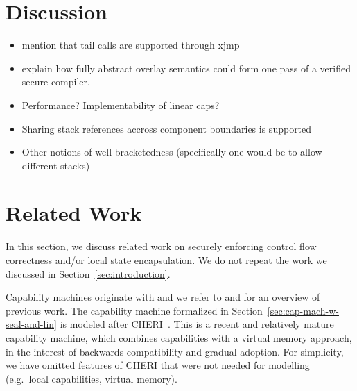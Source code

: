 \documentclass[acmsmall,review,anonymous]{acmart}\settopmatter{printfolios=true,printccs=false,printacmref=false}
\begin{document}
\section{Discussion}
\label{sec:discussion}
\begin{itemize}
\item mention that tail calls are supported through xjmp
\item explain how fully abstract overlay semantics could form one pass of a verified secure compiler.
\item Performance?  Implementability of linear caps?
\item Sharing stack references accross component boundaries is supported
\item Other notions of well-bracketedness (specifically one would be to allow different stacks)
\end{itemize}

\section{Related Work}

In this section, we discuss related work on securely enforcing control flow correctness and/or local state encapsulation.
We do not repeat the work we discussed in Section~\ref{sec:introduction}.

Capability machines originate with \citet{dennis_programming_1966} and we refer to \citet{levy_capability-based_1984} and \citet{watson_cheri:_2015} for an overview of previous work.
The capability machine formalized in Section~\ref{sec:cap-mach-w-seal-and-lin} is modeled after CHERI~\citep{watson_cheri:_2015,woodruff_cheri_2014}.
This is a recent and relatively mature capability machine, which combines capabilities with a virtual memory approach, in the interest of backwards compatibility and gradual adoption.
For simplicity, we have omitted features of CHERI that were not needed for modelling \stktokens{} (e.g.\ local capabilities, virtual memory).
\end{document}
